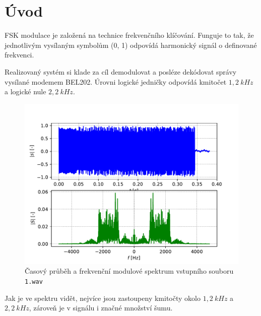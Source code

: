 \section*{Úvod}

FSK modulace je založená na technice frekvenčního klíčování. Funguje to tak, že jednotlivým vysílaným symbolům (0, 1) odpovídá harmonický signál o definované frekvenci.

Realizovaný systém si klade za cíl demodulovat a posléze dekódovat správy vysílané modemem BEL202. Úrovni logické jedničky odpovídá kmitočet $1,2~kHz$ a logické nule $2,2~kHz$.

\begin{figure}[H]
    \centering
    \includegraphics[width=\textwidth]{img/wav.pdf}
    \caption{Časový průběh a frekvenční modulové spektrum vstupního souboru \texttt{1.wav}}
\end{figure}

Jak je ve spektru vidět, nejvíce jsou zastoupeny kmitočty okolo $1,2~kHz$ a $2,2~kHz$, zároveň je v signálu i značné množství šumu.
